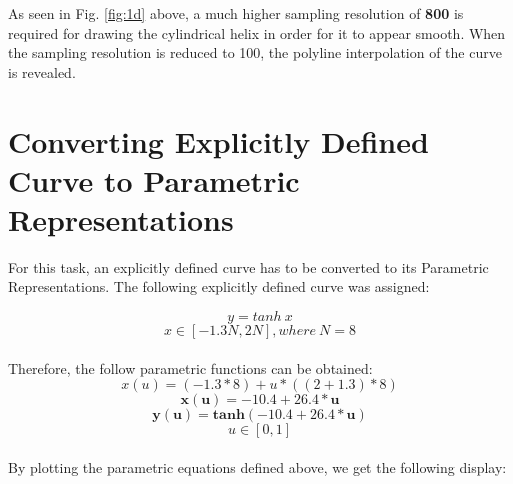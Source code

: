 \documentclass[acmlarge,nonacm=true]{acmart}
\begin{document}
As seen in Fig. \ref{fig:1d} above, a much higher sampling resolution of \textbf{800} is required for drawing the cylindrical helix in order for
it to appear smooth. When the sampling resolution is reduced to 100, the polyline interpolation of the curve is revealed.

\pagebreak
\section{Converting Explicitly Defined Curve to Parametric Representations}
\label{section:p2}
For this task, an explicitly defined curve has to be converted to its Parametric Representations. The following explicitly defined 
curve was assigned:

\begin{displaymath}
	y = tanh \ x
\end{displaymath}
\begin{displaymath}
	x \in [-1.3N, 2N], where \  N = 8
\end{displaymath}
\\Therefore, the follow parametric functions can be obtained:
\begin{displaymath}
	x(u) = (-1.3 * 8) + u * ((2+1.3) * 8)
\end{displaymath}
\begin{displaymath}
	\mathbf{x(u) = -10.4 + 26.4*u}
\end{displaymath}
\begin{displaymath}
	\mathbf{y(u) = tanh(-10.4 + 26.4*u)}
\end{displaymath}
\begin{displaymath}
	u \in [0,1]
\end{displaymath}
\\
By plotting the parametric equations defined above, we get the following display:\\
\end{document}
